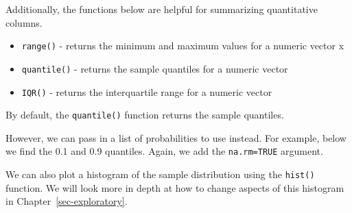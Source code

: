 \documentclass[
  letterpaper,
]{krantz}
\makeatletter
\newenvironment{Shaded}{\begin{snugshade}}{\end{snugshade}}
\newcommand{\AttributeTok}[1]{\textcolor[rgb]{0.40,0.45,0.13}{#1}}
\newcommand{\CommentTok}[1]{\textcolor[rgb]{0.37,0.37,0.37}{#1}}
\newcommand{\ConstantTok}[1]{\textcolor[rgb]{0.56,0.35,0.01}{#1}}
\newcommand{\FloatTok}[1]{\textcolor[rgb]{0.68,0.00,0.00}{#1}}
\newcommand{\FunctionTok}[1]{\textcolor[rgb]{0.28,0.35,0.67}{#1}}
\newcommand{\NormalTok}[1]{\textcolor[rgb]{0.00,0.23,0.31}{#1}}
\newcommand{\SpecialCharTok}[1]{\textcolor[rgb]{0.37,0.37,0.37}{#1}}
\providecommand{\tightlist}{%
  \setlength{\itemsep}{0pt}\setlength{\parskip}{0pt}}\usepackage{longtable,booktabs,array}
\newenvironment{kframe}{%
\medskip{}
\setlength{\fboxsep}{.8em}
 \def\at@end@of@kframe{}%
 \ifinner\ifhmode%
  \def\at@end@of@kframe{\end{minipage}}%
  \begin{minipage}{\columnwidth}%
 \fi\fi%
 \def\FrameCommand##1{\hskip\@totalleftmargin \hskip-\fboxsep
 \colorbox{shadecolor}{##1}\hskip-\fboxsep
     \hskip-\linewidth \hskip-\@totalleftmargin \hskip\columnwidth}%
 \MakeFramed {\advance\hsize-\width
   \@totalleftmargin\z@ \linewidth\hsize
   \@setminipage}}%
 {\par\unskip\endMakeFramed%
 \at@end@of@kframe}
\renewenvironment{Shaded}{\begin{kframe}}{\end{kframe}}
\makeatother
\begin{document}
Additionally, the functions below are helpful for summarizing
quantitative columns.

\begin{itemize}
\tightlist
\item
  \texttt{range()} - returns the minimum and maximum values for a
  numeric vector x
\item
  \texttt{quantile()} - returns the sample quantiles for a numeric
  vector
\item
  \texttt{IQR()} - returns the interquartile range for a numeric vector
\end{itemize}

By default, the \texttt{quantile()} function returns the sample
quantiles.

\begin{Shaded}
\end{Shaded}

However, we can pass in a list of probabilities to use instead. For
example, below we find the 0.1 and 0.9 quantiles. Again, we add the
\texttt{na.rm=TRUE} argument.

\begin{Shaded}
\end{Shaded}

We can also plot a histogram of the sample distribution using the
\texttt{hist()} function. We will look more in depth at how to change
aspects of this histogram in Chapter~\ref{sec-exploratory}.

\begin{Shaded}
\end{Shaded}
\end{document}
